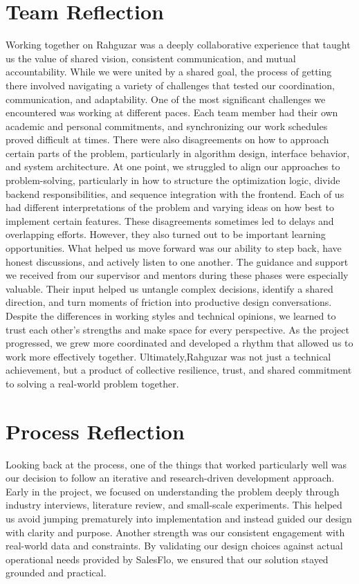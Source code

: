 \section{Team Reflection}
Working together on Rahguzar was a deeply collaborative experience that taught us the value of shared vision, consistent communication, and mutual accountability.
While we were united by a shared goal, the process of getting there involved navigating a variety of challenges that tested our coordination, communication, and adaptability. One of the most significant challenges we encountered was working at different paces. Each team member had their own academic and personal commitments, and synchronizing our work schedules proved difficult at times. There were also disagreements on how to approach certain parts of the problem, particularly in algorithm design, interface behavior, and system architecture.
At one point, we struggled to align our approaches to problem-solving, particularly in how to structure the optimization logic, divide backend responsibilities, and sequence integration with the frontend. Each of us had different interpretations of the problem and varying ideas on how best to implement certain features. These disagreements sometimes led to delays and overlapping efforts. However, they also turned out to be important learning opportunities. What helped us move forward was our ability to step back, have honest discussions, and actively listen to one another. The guidance and support we received from our supervisor and mentors during these phases were especially valuable. Their input helped us untangle complex decisions, identify a shared direction, and turn moments of friction into productive design conversations.
Despite the differences in working styles and technical opinions, we learned to trust each other’s strengths and make space for every perspective. As the project progressed, we grew more coordinated and developed a rhythm that allowed us to work more effectively together. Ultimately,Rahguzar was not just a technical achievement, but a product of collective resilience, trust, and shared commitment to solving a real-world problem together.
\section{Process Reflection}
Looking back at the process, one of the things that worked particularly well was our decision to follow an iterative and research-driven development approach. Early in the project, we focused on understanding the problem deeply through industry interviews, literature review, and small-scale experiments. This helped us avoid jumping prematurely into implementation and instead guided our design with clarity and purpose.
Another strength was our consistent engagement with real-world data and constraints. By validating our design choices against actual operational needs provided by SalesFlo, we ensured that our solution stayed grounded and practical.

